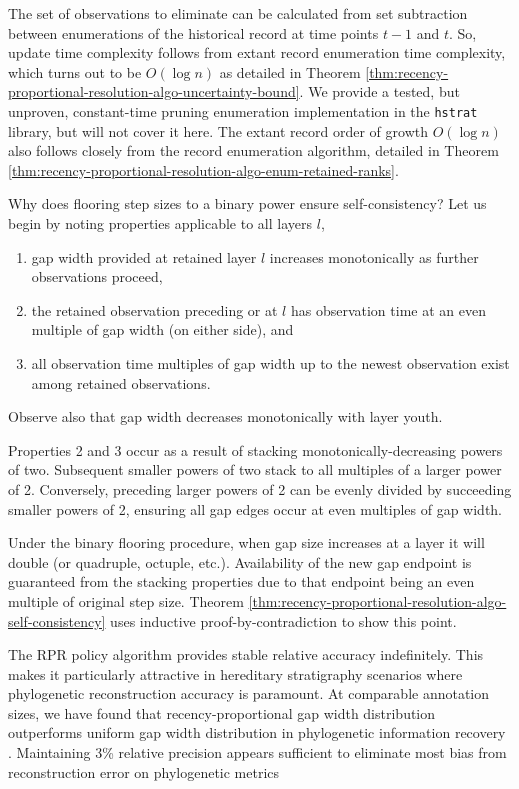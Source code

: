 The set of observations to eliminate can be calculated from set subtraction between enumerations of the historical record at time points $t-1$ and $t$.
So, update time complexity follows from extant record enumeration time complexity, which turns out to be $O(\log n)$ as detailed in Theorem \ref{thm:recency-proportional-resolution-algo-uncertainty-bound}.
We provide a tested, but unproven, constant-time pruning enumeration implementation in the \texttt{hstrat} library, but will not cover it here.
The extant record order of growth $O(\log n)$ also follows closely from the record enumeration algorithm, detailed in Theorem \ref{thm:recency-proportional-resolution-algo-enum-retained-ranks}.

Why does flooring step sizes to a binary power ensure self-consistency?
Let us begin by noting properties applicable to all layers $l$,
\begin{enumerate}
\item gap width provided at retained layer $l$ increases monotonically as further observations proceed,
\item the retained observation preceding or at $l$ has observation time at an even multiple of gap width (on either side), and
\item all observation time multiples of gap width up to the newest observation exist among retained observations.
\end{enumerate}
Observe also that gap width decreases monotonically with layer youth.

Properties 2 and 3 occur as a result of stacking monotonically-decreasing powers of two.
Subsequent smaller powers of two stack to all multiples of a larger power of 2.
Conversely, preceding larger powers of 2 can be evenly divided by succeeding smaller powers of 2, ensuring all gap edges occur at even multiples of gap width.

Under the binary flooring procedure, when gap size increases at a layer it will double (or quadruple, octuple, etc.).
Availability of the new gap endpoint is guaranteed from the stacking properties due to that endpoint being an even multiple of original step size.
Theorem \ref{thm:recency-proportional-resolution-algo-self-consistency} uses inductive proof-by-contradiction to show this point.

The RPR policy algorithm provides stable relative accuracy indefinitely.
This makes it particularly attractive in hereditary stratigraphy scenarios where phylogenetic reconstruction accuracy is paramount.
At comparable annotation sizes, we have found that recency-proportional gap width distribution outperforms uniform gap width distribution in phylogenetic information recovery \citep{moreno2022hereditary}.
Maintaining 3\% relative precision appears sufficient to eliminate most bias from reconstruction error on phylogenetic metrics \citep{moreno2023toward}

